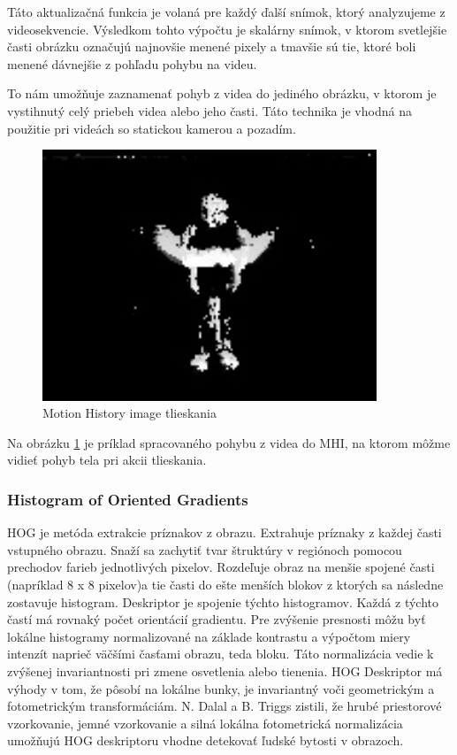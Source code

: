 Táto aktualizačná funkcia je volaná pre každý ďalší snímok, ktorý analyzujeme z videosekvencie. Výsledkom tohto výpočtu je skalárny snímok, v ktorom svetlejšie časti obrázku označujú najnovšie menené pixely a tmavšie sú tie, ktoré boli menené dávnejšie z pohľadu pohybu na videu.

To nám umožňuje zaznamenať pohyb z videa do jediného obrázku, v ktorom je vystihnutý celý priebeh videa alebo jeho časti. Táto technika je vhodná na použitie pri videách so statickou kamerou a pozadím.\cite{c10}

\begin{figure}[!htbp]
  \centering
  \includegraphics[width=10cm]{img/MHIclap.jpg}
  \caption{Motion History image tlieskania}
  \label{MHIclap}
\end{figure}

Na obrázku \ref{MHIclap} je príklad spracovaného pohybu z videa do MHI, na ktorom môžme vidieť pohyb tela pri akcii tlieskania.

	 

\subsubsection{Histogram of Oriented Gradients}
HOG je metóda extrakcie príznakov z obrazu. Extrahuje príznaky z každej časti vstupného obrazu. Snaží sa zachytiť tvar štruktúry v regiónoch pomocou prechodov farieb jednotlivých pixelov. Rozdeľuje obraz na menšie spojené časti (napríklad 8 x 8 pixelov)a tie časti do ešte menších blokov z ktorých sa následne zostavuje histogram. Deskriptor je spojenie týchto histogramov.  Každá z týchto častí  má rovnaký počet orientácií gradientu.  Pre zvýšenie presnosti môžu byť lokálne histogramy normalizované na základe kontrastu a výpočtom miery intenzít naprieč väčšími časťami obrazu, teda bloku. Táto normalizácia vedie k zvýšenej invariantnosti pri zmene osvetlenia alebo tienenia. HOG Deskriptor má výhody v tom, že pôsobí na lokálne bunky, je invariantný voči geometrickým a fotometrickým transformáciám. N. Dalal a B. Triggs zistili, že hrubé priestorové vzorkovanie, jemné vzorkovanie a silná lokálna fotometrická normalizácia umožňujú HOG deskriptoru vhodne detekovať ľudské bytosti v obrazoch. 


